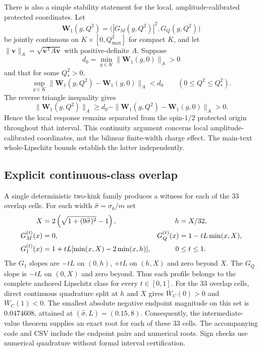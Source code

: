 \documentclass[12pt]{iopjournal}
\begin{document}
There is also a simple stability statement for the local, amplitude-calibrated protected coordinates. Let
\begin{equation}
\bm W_1(g,Q^2)=\bigl(|G_M(g,Q^2)|^2,G_Q(g,Q^2)\bigr)
\end{equation}
be jointly continuous on $K\times[0,Q_{\max}^2]$ for compact $K$, and let $\|\bm v\|_A=\sqrt{\bm v^{\mathsf T}A\bm v}$ with positive-definite $A$. Suppose
\begin{equation}
d_0=\min_{g\in K}\|\bm W_1(g,0)\|_A>0
\end{equation}
and that for some $Q_\ast^2>0$,
\begin{equation}
\sup_{g\in K}\|\bm W_1(g,Q^2)-\bm W_1(g,0)\|_A<d_0
\qquad (0\le Q^2\le Q_\ast^2).
\end{equation}
The reverse triangle inequality gives
\begin{equation}
\|\bm W_1(g,Q^2)\|_A\ge d_0-\|\bm W_1(g,Q^2)-\bm W_1(g,0)\|_A>0.
\end{equation}
Hence the local response remains separated from the spin-$1/2$ protected origin throughout that interval. This continuity argument concerns local amplitude-calibrated coordinates, not the bilinear finite-width charge effect. The main-text whole-Lipschitz bounds establish the latter independently.


\subsection{Explicit continuous-class overlap}

A single deterministic two-kink family produces a witness for each of the 33 overlap cells. For each width $\widehat\sigma=\sigma_k/m$ set
\begin{align}
X&=2\left(\sqrt{1+(9\widehat\sigma)^2}-1\right),
&h&=X/32,\notag\\
G_M^{(t)}(x)&=0,
&G_Q^{(t)}(x)&=1-tL\min(x,X),\notag\\
G_1^{(t)}(x)&=1+tL[\min(x,X)-2\min(x,h)],
&0&\le t\le1.
\end{align}
The $G_1$ slopes are $-tL$ on $(0,h)$, $+tL$ on $(h,X)$ and zero beyond $X$. The $G_Q$ slope is $-tL$ on $(0,X)$ and zero beyond. Thus each profile belongs to the complete anchored Lipschitz class for every $t\in[0,1]$. For the 33 overlap cells, direct continuous quadrature split at $h$ and $X$ gives $\overline W_C(0)>0$ and $\overline W_C(1)<0$. The smallest absolute negative endpoint magnitude on this set is $0.0474608$, attained at $(\widehat\sigma,L)=(0.15,8)$. Consequently, the intermediate-value theorem supplies an exact root for each of these 33 cells. The accompanying code and CSV include the endpoint pairs and numerical roots. Sign checks use numerical quadrature without formal interval certification.
\end{document}
